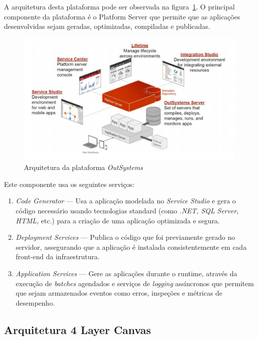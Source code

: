 A arquitetura desta plataforma pode ser observada na figura~\ref{fig:outsystemsArch}. 
O principal componente da plataforma é o Platform Server que permite que as aplicações 
desenvolvidas sejam geradas, optimizadas, compiladas e publicadas. 

\begin{figure}[H]
  \centering
  \includegraphics[]{figures/Architecture.png}
  \caption{Arquitetura da plataforma \textit{OutSystems}}\label{fig:outsystemsArch}
\end{figure}

Este componente usa os seguintes serviços: 
\begin{enumerate}
  \item \textit{Code Generator} --- Usa a aplicação modelada no \textit{Service Studio} e gera o código necessário usando tecnologias standard (como \textit{.NET, SQL Server, HTML,} etc.) para a criação de uma aplicação optimizada e segura.
  \item \textit{Deployment Services} --- Publica o código que foi previamente gerado no servidor, assegurando que a aplicação é instalada consistentemente em cada front-end da infraestrutura.
  \item \textit{Application Services} --- Gere as aplicações durante o runtime, através da execução de \textit{batches} agendados e serviços de \textit{logging} assíncronos que permitem que sejam armazenados eventos como erros, inspeções e métricas de desempenho.
\end{enumerate}

\newpage

\subsection{Arquitetura 4 Layer Canvas}\label{sec:4lc}

